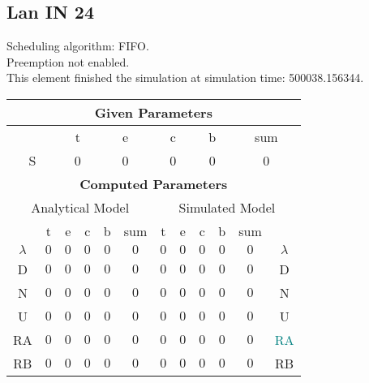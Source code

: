\documentclass{article}
\begin{document}
\subsection{Lan IN 24}
Scheduling algorithm: FIFO.\\Preemption not enabled. \\This element finished the simulation at simulation time: 500038.156344.\\
\begin{table}[H]\centering\begin{tabular}{@{}c|cccc|c||cccc|c|c@{}}\toprule\multicolumn{12}{c}{\textbf{Given Parameters}}\\\midrule\multicolumn{2}{c|}{ } & \multicolumn{2}{c}{t} & \multicolumn{2}{c}{e} & \multicolumn{2}{c}{c} & \multicolumn{2}{c}{b} & \multicolumn{2}{|c}{sum} \\ \midrule\multicolumn{2}{c|}{S} & \multicolumn{2}{c}{0} & \multicolumn{2}{c}{0} & \multicolumn{2}{c}{0} & \multicolumn{2}{c}{0} & \multicolumn{2}{|c}{0}\\ \midrule\midrule\multicolumn{12}{c}{\textbf{Computed Parameters}}\\ \midrule\multicolumn{6}{c||}{Analytical Model} & \multicolumn{6}{c}{Simulated Model}\\ 
 \midrule & t & e & c & b & sum & t & e & c & b & sum &  \\ \midrule$\lambda$ &$0$ & $0$ & $0$ & $0$ & $0$ & $0$ & $0$ & $0$ & $0$ & $0$& $\lambda$ \\D & $0$ & $0$ & $0$ & $0$ & $0$ & $0$ & $0$ & $0$ & $0$ & $0$& D\\N & $0$ & $0$ & $0$ & $0$ & $0$ & $0$ & $0$ & $0$ & $0$ & $0$& N\\U & $0$ & $0$ & $0$ & $0$ & $0$ & $0$ & $0$ & $0$ & $0$ & $0$& U\\RA & $0$ & $0$ & $0$ & $0$ & $0$ & $0$ & $0$ & $0$ & $0$ & $0$& \textcolor{teal}{RA}\\RB & $0$ & $0$ & $0$ & $0$ & $0$ & $0$ & $0$ & $0$ & $0$ & $0$& RB\\
\bottomrule
\end{tabular}
\end{table}
\filbreak
\end{document}
